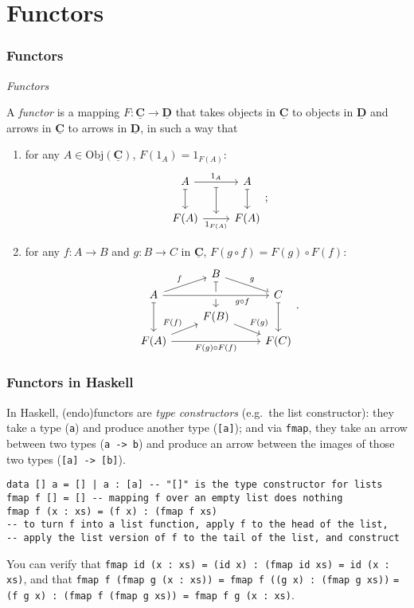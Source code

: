 \documentclass[10pt]{beamer}
\newcommand{\Cat}[1]{\ensuremath{\underline{\mathbf{#1}}}}
\newcommand{\Obj}[1]{\ensuremath{\mathrm{Obj}(\Cat{#1})}}
\theoremstyle{definition}
\theoremstyle{remark}
\numberwithin{equation}{section}
\begin{document}
\section{Functors}

\begin{frame}[fragile]
  \frametitle{Functors}

  \emph{Functors}

  A \emph{functor} is a mapping $F\colon \Cat{C} \rightarrow \Cat{D}$ that takes objects in
  $\Cat{C}$ to objects in $\Cat{D}$ and arrows in $\Cat{C}$ to arrows in
  $\Cat{D}$, in such a way that
  \begin{enumerate}
  \item for any $A \in \Obj{C}$, $F(1_A) = 1_{F(A)}$:
    \[
      \begin{tikzcd}
        A \arrow[mapsto]{d} \arrow[""' name = id]{r}{1_A} & A \arrow[mapsto]{d} \\
        F(A) \arrow[swap,""' name = Fid]{r}{1_{F(A)}} & F(A) \arrow[mapsto,from=id,to=Fid]
      \end{tikzcd}\rlap{;}
    \]
  \item for any $f\colon A \rightarrow B$ and $g\colon B \rightarrow C$ in $\Cat{C}$, $F(g \circ f) =
    F(g) \circ F(f)$:
    \[
      \begin{tikzcd}[row sep=tiny]
        & B \arrow[mapsto]{dd} \arrow{dr}{g} & \\
        A \arrow[mapsto]{dd} \arrow{ur}{f} \arrow[crossing over,swap,near end]{rr}{g \circ f} & & C \arrow[mapsto]{dd} \\
        & F(B) \arrow{dr}{F(g)} & \\
        F(A) \arrow{ur}{F(f)} \arrow[swap]{rr}{F(g) \circ F(f)} & & F(C)
      \end{tikzcd}\rlap{.}
    \]
  \end{enumerate}
\end{frame}

\begin{frame}
  \frametitle{Functors in Haskell}

  In Haskell, (endo)functors are \emph{type constructors} (e.g.\ the list
  constructor): they take a type (\lstinline{a}) and produce another type (\lstinline{[a]}); and via \lstinline{fmap}, they take an arrow between two
  types (\lstinline{a -> b}) and produce an arrow between the images of those
  two types (\lstinline{[a] -> [b]}).

\begin{lstlisting}[frame=single]
data [] a = [] | a : [a] -- "[]" is the type constructor for lists
fmap f [] = [] -- mapping f over an empty list does nothing
fmap f (x : xs) = (f x) : (fmap f xs)
-- to turn f into a list function, apply f to the head of the list,
-- apply the list version of f to the tail of the list, and construct
\end{lstlisting}

  You can verify that
  \lstinline{fmap id (x : xs) = (id x) : (fmap id xs) = id (x : xs)}, and that
  \lstinline{fmap f (fmap g (x : xs)) = fmap f ((g x) : (fmap g xs))}
  \lstinline{= (f g x) : (fmap f (fmap g xs)) = fmap f g (x : xs)}.
\end{frame}
\end{document}
